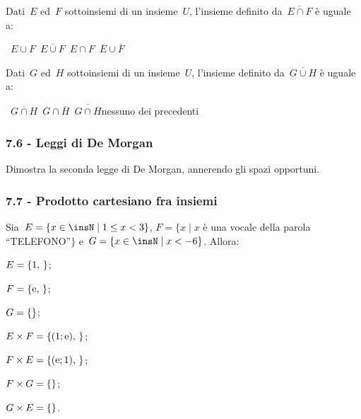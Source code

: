 \begin{esercizio}
 \label{ese:7.16}
Dati~$E$ ed~$F$ sottoinsiemi di un insieme~$U$, l'insieme
definito da~$\overline{E\cap F}$ è uguale a:
\begin{center}
\boxA\quad~$E\cup F$\quad\boxB\quad~$\overline{E\cup F}$\quad\boxC\quad~$E\cap F$\quad\boxD\quad~$\overline{E}\cup\overline{F}$
\end{center}
\end{esercizio}

\begin{esercizio}
 \label{ese:7.17}
Dati~$G$ ed~$H$ sottoinsiemi di un insieme~$U$, l'insieme
definito da~$\overline{G\cup H}$ è uguale a:
\begin{center}
\boxA\quad~$\overline{G\cap H}$\quad\boxB\quad~$\overline{G}\cap\overline{H}$\quad\boxC\quad~$\overline{G\cap \overline{H}}$\quad\boxD\quad nessuno dei precedenti
\end{center}
\end{esercizio}

\subsubsection*{7.6 - Leggi di De Morgan}

\begin{esercizio}
 \label{ese:7.18}
 Dimostra la seconda legge di De Morgan, annerendo gli spazi opportuni.
 \begin{center}
 
 \end{center}
\end{esercizio}

\subsubsection*{7.7 - Prodotto cartesiano fra insiemi}

\begin{esercizio}
\label{ese:7.19}
Sia~$E=\{x\in\insN\mid 1\le x<3\}$, $F=\{x\mid x$ è una vocale della parola ``TELEFONO''$\}$ e~$G=\{x\in\insN\mid x<-6\}$. Allora:
\begin{enumeratea}
 \item $E=\{1\text{, }\dotfill\}$;
 \item $F=\{\text{e, }\dotfill\}$;
 \item $G=\{\dotfill\}$;
 \item $E\times F=\{(1;\text{e})\text{, }\dotfill\}$;
 \item $F\times E=\{(\text{e};1)\text{, }\dotfill\}$;
 \item $F\times G=\{\dotfill\}$;
 \item $G\times E=\{\dotfill\}$.
\end{enumeratea}
\end{esercizio}

